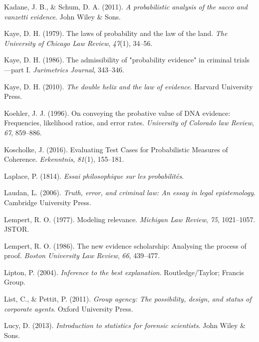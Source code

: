 \documentclass[11pt,dvipsnames,enabledeprecatedfontcommands]{scrartcl}
\begin{document}
\leavevmode\hypertarget{ref-kadane2011probabilistic}{}%
Kadane, J. B., \& Schum, D. A. (2011). \emph{A probabilistic analysis of
the sacco and vanzetti evidence}. John Wiley \& Sons.

\leavevmode\hypertarget{ref-kaye79}{}%
Kaye, D. H. (1979). The laws of probability and the law of the land.
\emph{The University of Chicago Law Review}, \emph{47}(1), 34--56.

\leavevmode\hypertarget{ref-kaye1986admissibility}{}%
Kaye, D. H. (1986). The admissibility of "probability evidence" in
criminal trials---part I. \emph{Jurimetrics Journal}, 343--346.

\leavevmode\hypertarget{ref-Kaye2010The-Double-Heli}{}%
Kaye, D. H. (2010). \emph{The double helix and the law of evidence}.
Harvard University Press.

\leavevmode\hypertarget{ref-Koehler1996On-Conveying-th}{}%
Koehler, J. J. (1996). On conveying the probative value of DNA evidence:
Frequencies, likelihood ratios, and error rates. \emph{University of
Colorado law Review}, \emph{67}, 859--886.

\leavevmode\hypertarget{ref-koscholke2016evaluating}{}%
Koscholke, J. (2016). Evaluating Test Cases for Probabilistic Measures
of Coherence. \emph{Erkenntnis}, \emph{81}(1), 155--181.

\leavevmode\hypertarget{ref-Laplace1814}{}%
Laplace, P. (1814). \emph{Essai philosophique sur les probabilités}.

\leavevmode\hypertarget{ref-laudan2006truth}{}%
Laudan, L. (2006). \emph{Truth, error, and criminal law: An essay in
legal epistemology}. Cambridge University Press.

\leavevmode\hypertarget{ref-lempert1977modeling}{}%
Lempert, R. O. (1977). Modeling relevance. \emph{Michigan Law Review},
\emph{75}, 1021--1057. JSTOR.

\leavevmode\hypertarget{ref-Lempert1986}{}%
Lempert, R. O. (1986). The new evidence scholarship: Analysing the
process of proof. \emph{Boston University Law Review}, \emph{66},
439--477.

\leavevmode\hypertarget{ref-Lipton2004-LIPITT}{}%
Lipton, P. (2004). \emph{Inference to the best explanation}.
Routledge/Taylor; Francis Group.

\leavevmode\hypertarget{ref-List2011Group}{}%
List, C., \& Pettit, P. (2011). \emph{Group agency: The possibility,
design, and status of corporate agents}. Oxford University Press.

\leavevmode\hypertarget{ref-lucy2013introduction}{}%
Lucy, D. (2013). \emph{Introduction to statistics for forensic
scientists}. John Wiley \& Sons.
\end{document}
